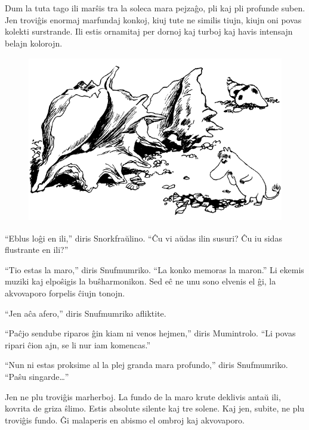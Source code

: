 Dum la tuta tago ili marŝis tra la soleca mara pejzaĝo, pli kaj pli profunde suben. Jen troviĝis enormaj marfundaj konkoj, kiuj tute ne similis tiujn, kiujn oni povas kolekti surstrande. Ili estis ornamitaj per dornoj kaj turboj kaj havis intensajn belajn kolorojn.

\begin{figure}[htbp]
\centering
\includegraphics[width=324pt,height=206pt]{7-7.png}
\caption{}
\label{7-7}
\end{figure}

``Eblus loĝi en ili,'' diris Snorkfraŭlino. ``Ĉu vi aŭdas ilin susuri? Ĉu iu sidas flustrante en ili?''

``Tio estas la maro,'' diris Snufmumriko. ``La konko memoras la maron.'' Li ekemis muziki kaj elpoŝigis la buŝharmonikon. Sed eĉ ne unu sono elvenis el ĝi, la akvovaporo forpelis ĉiujn tonojn.

``Jen aĉa afero,'' diris Snufmumriko afliktite.

``Paĉjo sendube riparos ĝin kiam ni venos hejmen,'' diris Mumintrolo. ``Li povas ripari ĉion ajn, se li nur iam komencas.''

``Nun ni estas proksime al la plej granda mara profundo,'' diris Snufmumriko. ``Paŝu singarde{\ldots}''

Jen ne plu troviĝis marherboj. La fundo de la maro krute deklivis antaŭ ili, kovrita de griza ŝlimo. Estis absolute silente kaj tre solene. Kaj jen, subite, ne plu troviĝis fundo. Ĝi malaperis en abismo el ombroj kaj akvovaporo.

